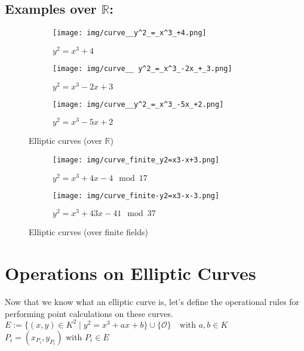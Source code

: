 \documentclass[bp,en]{FEIstyle}
\newcommand{\point}[1]{
#1 = (x_{#1}, y_{#1})
}
\begin{document}
\subsection*{Examples over $\mathbb{R}$:}
\begin{figure}[H]
    \centering
    \begin{subfigure}{0.3\textwidth}
        \texttt{[image: img/curve\_\_y^2\_=\_x^3\_+4.png]}
        \caption{$y^2 = x^3 + 4$}
        \label{fig:example_curve_1}
    \end{subfigure}%
    \hfill %
    \begin{subfigure}{0.3\textwidth}
        \texttt{[image: img/curve\_\_ y^2\_=\_x^3\_-2x\_+\_3.png]}
        \caption{$y^2 = x^3 - 2x + 3$}
        \label{fig:example_curve_2}
    \end{subfigure}%
    \hfill %
    \begin{subfigure}{0.3\textwidth}
        \texttt{[image: img/curve\_\_y^2\_=\_x^3\_-5x\_+2.png]}
        \caption{$y^2 = x^3 - 5x + 2$}
        \label{fig:example_curve_3}
    \end{subfigure}
    \caption{Elliptic curves (over $\mathbb{R}$)}
    \label{fig:example_elliptic_curves_1}
\end{figure}

\begin{figure}[H]
    \centering
    \begin{subfigure}{0.5\textwidth}
        \texttt{[image: img/curve\_finite\_y2=x3-x+3.png]}
        \caption{$y^2=x^3+4x-4 \mod 17$}
        \label{fig:example_curve_4}
    \end{subfigure}%
    \begin{subfigure}{0.4841\textwidth}
        \texttt{[image: img/curve\_finite-y2=x3-x-3.png]}
        \caption{$y^2=x^3+43x-41 \mod 37$}
        \label{fig:example_curve_5}
    \end{subfigure}%
    \caption{Elliptic curves (over finite fields)}
    \label{fig:example_elliptic_curves_2}
\end{figure}
\newpage
\section*{Operations on Elliptic Curves}
Now that we know what an elliptic curve is, let's define the operational rules for performing point calculations on these curves. \\
$E := \{ (x,y) \in K^2 \mid y^2 = x^3 + ax + b \} \cup \{ \mathcal{O} 
\} \quad \text{with } a, b \in K$ \\ 
$\point{P_i}$ with $P_i \in E$
\end{document}
